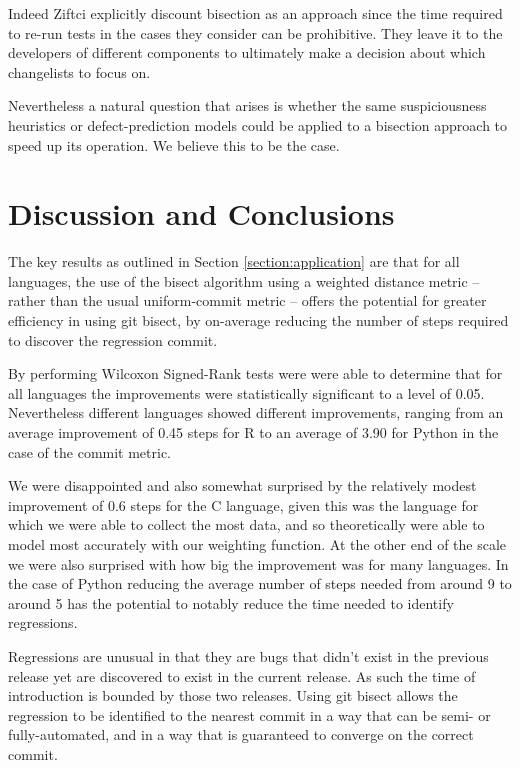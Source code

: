 \documentclass[10pt,journal,compsoc]{IEEEtran}
\begin{document}
Indeed Ziftci \etal explicitly discount bisection as an approach since the time required to re-run tests in the cases they consider can be prohibitive. They leave it to the developers of different components to ultimately make a decision about which changelists to focus on.

Nevertheless a natural question that arises is whether the same suspiciousness heuristics or defect-prediction models could be applied to a bisection approach to speed up its operation. We believe this to be the case. 

\section{Discussion and Conclusions}

The key results as outlined in Section \ref{section:application} are that for all languages, the use of the bisect algorithm using a weighted distance metric -- rather than the usual uniform-commit metric -- offers the potential for greater efficiency in using {\code git bisect}, by on-average reducing the number of steps required to discover the regression commit.

By performing Wilcoxon Signed-Rank tests were were able to determine that for all languages the improvements were statistically significant to a level of 0.05. Nevertheless different languages showed different improvements, ranging from an average improvement of 0.45 steps for R to an average of 3.90 for Python in the case of the commit metric.

We were disappointed and also somewhat surprised by the relatively modest improvement of 0.6 steps for the C language, given this was the language for which we were able to collect the most data, and so theoretically were able to model most accurately with our weighting function. At the other end of the scale we were also surprised with how big the improvement was for many languages. In the case of Python reducing the average number of steps needed from around 9 to around 5 has the potential to notably reduce the time needed to identify regressions.

Regressions are unusual in that they are bugs that didn't exist in the previous release yet are discovered to exist in the current release. As such the time of introduction is bounded by those two releases. Using {\code git bisect} allows the regression to be identified to the nearest commit in a way that can be semi- or fully-automated, and in a way that is guaranteed to converge on the correct commit.
\end{document}

